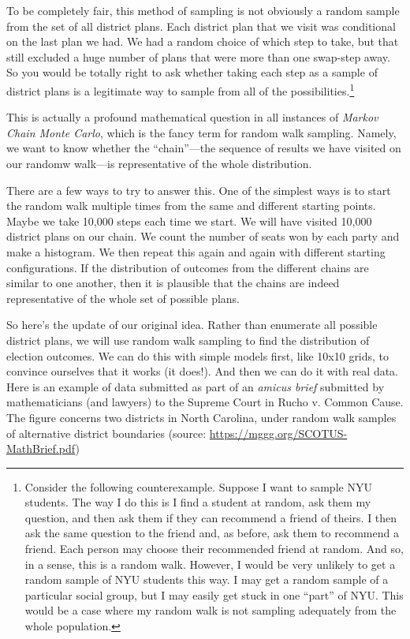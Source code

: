 \documentclass[
  openany]{book}
\begin{document}
To be completely fair, this method of sampling is not obviously a random sample from the set of all district plans. Each district plan that we visit was conditional on the last plan we had. We had a random choice of which step to take, but that still excluded a huge number of plans that were more than one swap-step away. So you would be totally right to ask whether taking each step as a sample of district plans is a legitimate way to sample from all of the possibilities.\footnote{Consider the following counterexample. Suppose I want to sample NYU students. The way I do this is I find a student at random, ask them my question, and then ask them if they can recommend a friend of theirs. I then ask the same question to the friend and, as before, ask them to recommend a friend. Each person may choose their recommended friend at random. And so, in a sense, this is a random walk. However, I would be very unlikely to get a random sample of NYU students this way. I may get a random sample of a particular social group, but I may easily get stuck in one ``part'' of NYU. This would be a case where my random walk is not sampling adequately from the whole population.}

This is actually a profound mathematical question in all instances of \emph{Markov Chain Monte Carlo}, which is the fancy term for random walk sampling. Namely, we want to know whether the ``chain''---the sequence of results we have visited on our randomw walk---is representative of the whole distribution.

There are a few ways to try to answer this. One of the simplest ways is to start the random walk multiple times from the same and different starting points. Maybe we take 10,000 steps each time we start. We will have visited 10,000 district plans on our chain. We count the number of seats won by each party and make a histogram. We then repeat this again and again with different starting configurations. If the distribution of outcomes from the different chains are similar to one another, then it is plausible that the chains are indeed representative of the whole set of possible plans.

So here's the update of our original idea. Rather than enumerate all possible district plans, we will use random walk sampling to find the distribution of election outcomes. We can do this with simple models first, like 10x10 grids, to convince ourselves that it works (it does!). And then we can do it with real data. Here is an example of data submitted as part of an \emph{amicus brief} submitted by mathematicians (and lawyers) to the Supreme Court in Rucho v. Common Cause. The figure concerns two districts in North Carolina, under random walk samples of alternative district boundaries (source: \url{https://mggg.org/SCOTUS-MathBrief.pdf})
\end{document}
